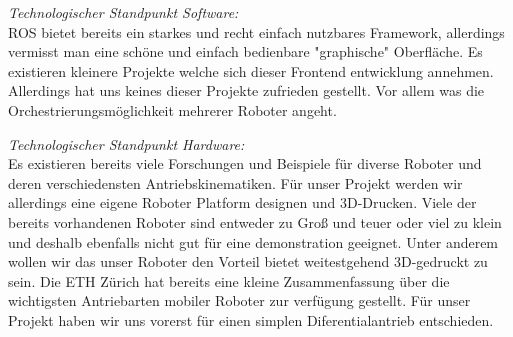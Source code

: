 \begin{flushleft}
    \textit{Technologischer Standpunkt Software:}\\
    ROS bietet bereits ein starkes und recht einfach nutzbares Framework, allerdings vermisst man eine 
    schöne und einfach bedienbare "graphische" Oberfläche.
    Es existieren kleinere Projekte welche sich dieser Frontend entwicklung annehmen. 
    Allerdings hat uns keines dieser Projekte zufrieden gestellt. 
    Vor allem was die Orchestrierungsmöglichkeit mehrerer Roboter angeht.
\end{flushleft}

\begin{flushleft}
    \textit{Technologischer Standpunkt Hardware:} \\
    Es existieren bereits viele Forschungen und Beispiele für diverse Roboter
    und deren verschiedensten Antriebskinematiken.
    Für unser Projekt werden wir allerdings eine eigene Roboter Platform designen und 3D-Drucken.
    Viele der bereits vorhandenen Roboter sind entweder zu Groß und teuer oder viel zu klein und deshalb ebenfalls nicht 
    gut für eine demonstration geeignet. Unter anderem wollen wir das unser Roboter den Vorteil bietet weitestgehend
    3D-gedruckt zu sein.
    Die ETH Zürich hat bereits eine kleine Zusammenfassung über die wichtigsten Antriebarten mobiler Roboter zur verfügung gestellt.
    Für unser Projekt haben wir uns vorerst für einen simplen Diferentialantrieb entschieden. 
\end{flushleft}